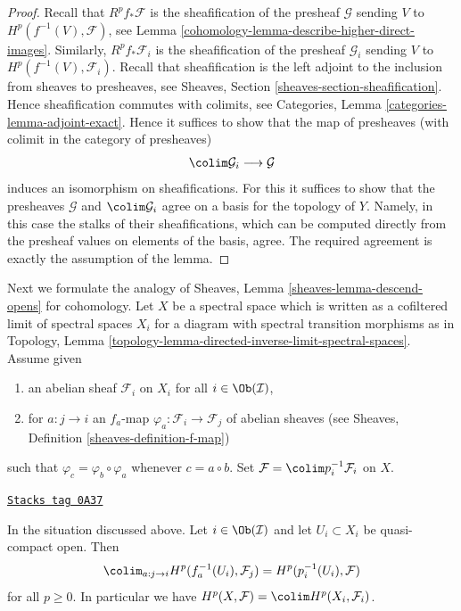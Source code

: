 \begin{proof}

Recall that $R^pf_*\mathcal{F}$ is the sheafification of the presheaf
$\mathcal{G}$ sending $V$ to $H^p(f^{-1}(V), \mathcal{F})$, see
Lemma \ref{cohomology-lemma-describe-higher-direct-images}. Similarly,
$R^pf_*\mathcal{F}_i$ is the sheafification of the presheaf
$\mathcal{G}_i$ sending $V$ to $H^p(f^{-1}(V), \mathcal{F}_i)$.
Recall that sheafification is the left adjoint to the inclusion
from sheaves to presheaves, see Sheaves, Section
\ref{sheaves-section-sheafification}. Hence sheafification commutes
with colimits, see Categories, Lemma \ref{categories-lemma-adjoint-exact}.
Hence it suffices to show that the map of presheaves (with colimit
in the category of presheaves)
$$
\colim \mathcal{G}_i \longrightarrow \mathcal{G}
$$
induces an isomorphism on sheafifications. For this it suffices to show
that the presheaves $\mathcal{G}$ and $\colim \mathcal{G}_i$
agree on a basis for the topology of $Y$. Namely, in this case the stalks
of their sheafifications, which can be computed directly from the
presheaf values on elements of the basis, agree.
The required agreement is exactly the assumption of the lemma.
\end{proof}

Next we formulate the analogy of
Sheaves, Lemma \ref{sheaves-lemma-descend-opens}
for cohomology.
Let $X$ be a spectral space which is written as a cofiltered limit
of spectral spaces $X_i$ for a diagram with spectral transition morphisms
as in
Topology, Lemma \ref{topology-lemma-directed-inverse-limit-spectral-spaces}.
Assume given
\begin{enumerate}
\item an abelian sheaf $\mathcal{F}_i$ on $X_i$ for all
$i \in \Ob(\mathcal{I})$,
\item for $a : j \to i$ an $f_a$-map
$\varphi_a : \mathcal{F}_i \to \mathcal{F}_j$ of abelian sheaves (see
Sheaves, Definition \ref{sheaves-definition-f-map})
\end{enumerate}
such that $\varphi_c = \varphi_b \circ \varphi_a$
whenever $c = a \circ b$. Set $\mathcal{F} = \colim p_i^{-1}\mathcal{F}_i$
on $X$.

\begin{lemma}[Colimit]
\label{cohomology-lemma-colimit}
\href{https://stacks.math.columbia.edu/tag/0A37}{\texttt{Stacks tag 0A37}}

In the situation discussed above.
Let $i \in \Ob(\mathcal{I})$ and let $U_i \subset X_i$ be quasi-compact open.
Then
$$
\colim_{a : j \to i} H^p(f_a^{-1}(U_i), \mathcal{F}_j) =
H^p(p_i^{-1}(U_i), \mathcal{F})
$$
for all $p \geq 0$. In particular we have
$H^p(X, \mathcal{F}) = \colim H^p(X_i, \mathcal{F}_i)$.
\end{lemma}

